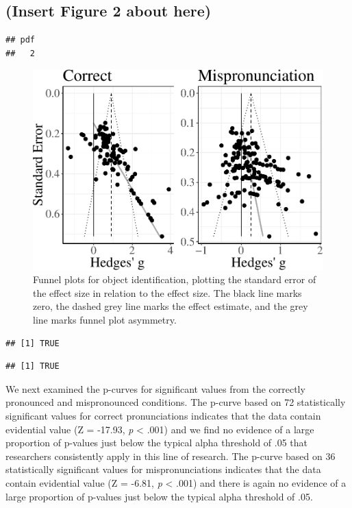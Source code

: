 \documentclass[man]{apa6}
\theoremstyle{definition}
\theoremstyle{definition}
\theoremstyle{definition}
\theoremstyle{remark}
\begin{document}
\subsection{(Insert Figure 2 about
here)}\label{insert-figure-2-about-here}

\begin{verbatim}
## pdf 
##   2
\end{verbatim}

\begin{figure}
\centering
\includegraphics{Paper_Analyses_files/figure-latex/FunnelCombo-1.pdf}
\caption{\label{fig:FunnelCombo}Funnel plots for object identification,
plotting the standard error of the effect size in relation to the effect
size. The black line marks zero, the dashed grey line marks the effect
estimate, and the grey line marks funnel plot asymmetry.}
\end{figure}

\begin{verbatim}
## [1] TRUE
\end{verbatim}

\begin{verbatim}
## [1] TRUE
\end{verbatim}

We next examined the p-curves for significant values from the correctly
pronounced and mispronounced conditions. The p-curve based on 72
statistically significant values for correct pronunciations indicates
that the data contain evidential value (Z = -17.93, \emph{p} \textless{}
.001) and we find no evidence of a large proportion of p-values just
below the typical alpha threshold of .05 that researchers consistently
apply in this line of research. The p-curve based on 36 statistically
significant values for mispronunciations indicates that the data contain
evidential value (Z = -6.81, \emph{p} \textless{} .001) and there is
again no evidence of a large proportion of p-values just below the
typical alpha threshold of .05.
\end{document}
